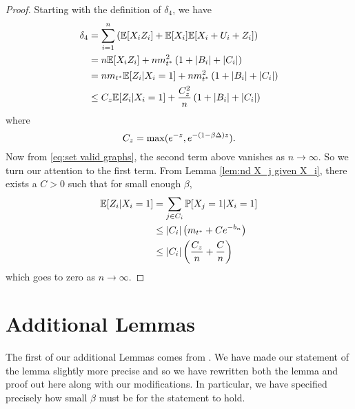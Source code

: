 	\begin{proof}
		Starting with the definition of $\delta_4$, we have
		\begin{align}
			\delta_4 &= \sum_{i = 1}^n \left(\mathbb{E}[X_i Z_i] + \mathbb{E}[X_i]\mathbb{E}[X_i + U_i + Z_i]\right)\\
				&= n \mathbb{E}[X_i Z_i] + n m_{t^*}^2 \left(1 + |B_i| + |C_i|\right)\\
				&= n m_{t^*} \mathbb{E}[Z_i | X_i = 1] + n m_{t^*}^2 \left(1 + |B_i| + |C_i|\right)\\
				&\leq C_z \mathbb{E}[Z_i | X_i = 1] + \frac{C_z^2}{n} \left(1 + |B_i| + |C_i|\right)
		\end{align}
		where 
		\begin{equation}
			C_z = \max(e^{-z}, e^{-(1 - \beta \Delta)z}).
		\end{equation}
		Now from \eqref{eq:set valid graphs}, the second term above vanishes as $n \rightarrow \infty$. So we turn our attention to the first term. From Lemma \ref{lem:nd X_j given X_i}, there exists a $C > 0$ such that for small enough $\beta$,
		\begin{align}
			\mathbb{E}[Z_i | X_i = 1] &= \sum_{j \in C_i} \mathbb{P}[X_j = 1 | X_i = 1]\\
				&\leq |C_i| \left(m_{t^*} + C e^{-b_n}\right)\\
				&\leq |C_i| \left(\frac{C_z}{n} + \frac{C}{n}\right)
		\end{align}
		which goes to zero as $n \rightarrow \infty$.
	\end{proof}

\section{Additional Lemmas}
\label{sec:additional lemmas nd}
	The first of our additional Lemmas comes from \cite[Lemma 3.1]{Lubetzky2014-po}. We have made our statement of the lemma slightly more precise and so we have rewritten both the lemma and proof out here along with our modifications. In particular, we have specified precisely how small $\beta$ must be for the statement to hold.

